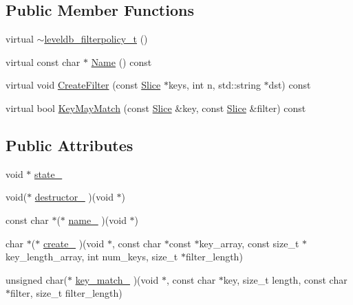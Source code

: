 \subsection*{Public Member Functions}
\begin{DoxyCompactItemize}
\item 
virtual \mbox{\hyperlink{structleveldb__filterpolicy__t_afea40a87cf4123be464f22d021dec9f3}{$\sim$leveldb\+\_\+filterpolicy\+\_\+t}} ()
\item 
virtual const char $\ast$ \mbox{\hyperlink{structleveldb__filterpolicy__t_a94f31f3d4576ed53d9277e461717e9f3}{Name}} () const
\item 
virtual void \mbox{\hyperlink{structleveldb__filterpolicy__t_aa833af852917381cd8db4c8ec21a3762}{Create\+Filter}} (const \mbox{\hyperlink{classleveldb_1_1_slice}{Slice}} $\ast$keys, int n, std\+::string $\ast$dst) const
\item 
virtual bool \mbox{\hyperlink{structleveldb__filterpolicy__t_a76ed49d956a58622e86d87a89a9ba1f1}{Key\+May\+Match}} (const \mbox{\hyperlink{classleveldb_1_1_slice}{Slice}} \&key, const \mbox{\hyperlink{classleveldb_1_1_slice}{Slice}} \&filter) const
\end{DoxyCompactItemize}
\subsection*{Public Attributes}
\begin{DoxyCompactItemize}
\item 
void $\ast$ \mbox{\hyperlink{structleveldb__filterpolicy__t_a35aa5dd2f350f6eafa4ae904e55dcbe2}{state\+\_\+}}
\item 
void($\ast$ \mbox{\hyperlink{structleveldb__filterpolicy__t_ac743c53a14a4061cf30832a1861573ed}{destructor\+\_\+}} )(void $\ast$)
\item 
const char $\ast$($\ast$ \mbox{\hyperlink{structleveldb__filterpolicy__t_a5fbc18ad0916314ffafe205543bad720}{name\+\_\+}} )(void $\ast$)
\item 
char $\ast$($\ast$ \mbox{\hyperlink{structleveldb__filterpolicy__t_acf8194876ecb2c47ef33cb7a7dec3d8e}{create\+\_\+}} )(void $\ast$, const char $\ast$const $\ast$key\+\_\+array, const size\+\_\+t $\ast$key\+\_\+length\+\_\+array, int num\+\_\+keys, size\+\_\+t $\ast$filter\+\_\+length)
\item 
unsigned char($\ast$ \mbox{\hyperlink{structleveldb__filterpolicy__t_a453f04cb3420879256c6194b5de0a818}{key\+\_\+match\+\_\+}} )(void $\ast$, const char $\ast$key, size\+\_\+t length, const char $\ast$filter, size\+\_\+t filter\+\_\+length)
\end{DoxyCompactItemize}


